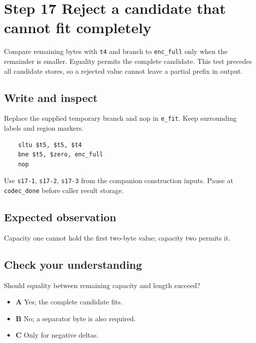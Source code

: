 \section{Step 17 Reject a candidate that cannot fit completely}\label{delta-s17}

Compare remaining bytes with \texttt{t4} and branch to \texttt{enc\_full} only when the remainder is smaller. Equality permits the complete candidate. This test precedes all candidate stores, so a rejected value cannot leave a partial prefix in output.

\subsection{Write and inspect}
Replace the supplied temporary branch and nop in \texttt{e\_fit}. Keep surrounding labels and region markers.

\begin{verbatim}
    sltu $t5, $t5, $t4
    bne $t5, $zero, enc_full
    nop
\end{verbatim}
Use \texttt{s17-1}, \texttt{s17-2}, \texttt{s17-3} from the companion construction inputs. Pause at \texttt{codec\_done} before caller result storage.

\subsection{Expected observation}
Capacity one cannot hold the first two-byte value; capacity two permits it.

\subsection{Check your understanding}
Should equality between remaining capacity and length succeed?

\begin{itemize}
\item \textbf{A} Yes; the complete candidate fits.
\item \textbf{B} No; a separator byte is also required.
\item \textbf{C} Only for negative deltas.
\end{itemize}
